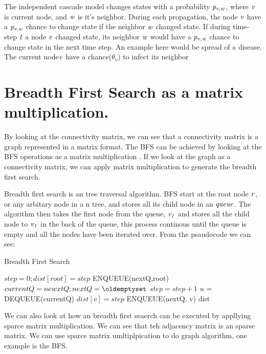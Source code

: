 The independent cascade model changes states with a probability $\it{p_{v, w}}$, where $\it{ v }$ is current node, and $\it{w}$ is it's neighbor. During each propagation, the node $\it{v}$ have a  $\it{p_{v, w}}$ chance to change state if the neighbor $\it{w}$ changed state. If during time-step $\it{t}$ a node $\it{v}$ changed state, its neighbor $\it{w}$ would have a $\it{p_{v, w}}$ chance to change state in the next time step. An example here would be spread of a disease. The current node$\it{v}$ have a chance($\theta_v$) to infect its neighbor

\section{Breadth First Search as a matrix multiplication.}
By looking at the 	connectivity matrix, we can see that a connectivity matrix is a graph represented in a matrix format. The BFS can be achieved by looking at the BFS operations as a matrix multiplication \cite{algoToMath}. If we look at the graph as a connectivity matrix, we can apply matrix multiplication to generate the breadth first search. 

Breadth first search is an tree traversal algorithm. BFS start at the root node $\it{r}$, or any arbitary node in a n tree, and stores all its child node in an $\it{queue}$. The algorithm then takes the first node from the queue, $\it{v_1}$ and stores all the child node to $\it{v_1}$ in the back of the queue, this process continous until the queue is empty and all the nodes have been iterated over. From the psaudocode we can see:

\begin{algorithm}
\caption{Breadth First Search}
\begin{algorithmic}[1]
\State $step = 0; dist[root] = step$
\State ENQUEUE(nextQ,root)
\State $currentQ = newxtQ; nextQ = \oldemptyset$
\State $step = step+1$
\State$ u$ = DEQUEUE(currentQ)
\State $dist[v] = step$
\State ENQUEUE(nextQ, v)
\EndIf
\EndFor
\EndWhile
\EndWhile
\Return dist
\end{algorithmic}
\end{algorithm}

We can also look at how an breadth first seaerch can be executed by appllying  sparce matrix multiplication. We can see that teh adjacency matrix is an sparse matrix. We can use sparce matrix umltiplpication to do graph algorithm, one example is the BFS. 


